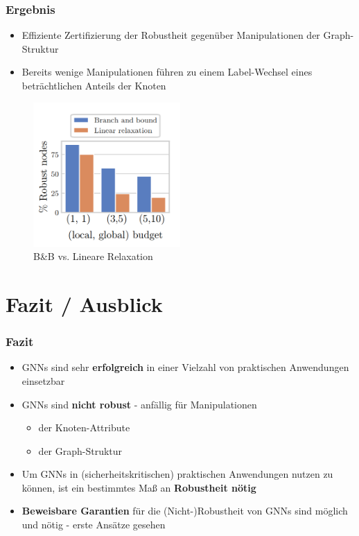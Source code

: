 \documentclass{beamer}
\begin{document}
\begin{frame}
  \frametitle{Ergebnis}
  \begin{itemize}
    \item Effiziente Zertifizierung der Robustheit gegenüber Manipulationen der Graph-Struktur
    \item Bereits wenige Manipulationen führen zu einem Label-Wechsel eines beträchtlichen Anteils der Knoten
  \end{itemize}
  \begin{figure}
    \centering
    \includegraphics[width=0.5\textwidth]{img/graph_struct_pert_res.png}
    \caption*{B\&B vs. Lineare Relaxation \cite{10.1145/3394486.3403217}}
  \end{figure}
\end{frame}

\section{Fazit / Ausblick}

\begin{frame}
  \frametitle{Fazit}

  \begin{itemize}
    \item GNNs sind sehr \textbf{erfolgreich} in einer Vielzahl von praktischen Anwendungen einsetzbar
    \item GNNs sind \textbf{nicht robust} - anfällig für Manipulationen
    \begin{itemize}
      \item der Knoten-Attribute
      \item der Graph-Struktur
    \end{itemize}
    \item Um GNNs in (sicherheitskritischen) praktischen Anwendungen nutzen zu können, ist ein bestimmtes Maß an \textbf{Robustheit nötig}
    \item \textbf{Beweisbare Garantien} für die (Nicht-)Robustheit von GNNs sind möglich und nötig - erste Ansätze gesehen
  \end{itemize}
\end{frame}
\end{document}
